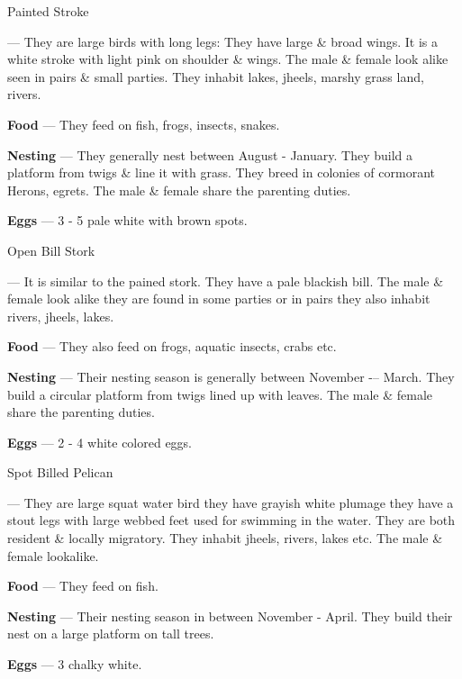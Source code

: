 \begin{bird}{Painted Stroke}

 --- They are large birds with long legs: They have large \& broad wings. It is a white stroke with light pink on shoulder \& wings. The male \& female look alike seen in pairs \& small parties. They inhabit lakes, jheels, marshy grass land, rivers.

{\large\bf Food} --- They feed on fish, frogs, insects, snakes.

{\large\bf Nesting} --- They generally nest between August - January. They build a platform from twigs \& line it with grass. They breed in colonies of cormorant Herons, egrets. The male \& female share the parenting duties.

{\large\bf Eggs} --- 3 - 5 pale white with brown spots.
\end{bird}

\begin{bird}{Open Bill Stork}

 --- It is similar to the pained stork. They have a pale blackish bill. The male \& female look alike they are found in some parties or in pairs they also inhabit rivers, jheels, lakes.

{\large\bf Food} --- They also feed on frogs, aquatic insects, crabs etc.

{\large\bf Nesting} --- Their nesting season is generally between November -– March. They build a circular platform from twigs lined up with leaves. The male \& female share the parenting duties. 

{\large\bf Eggs} --- 2 - 4 white colored eggs.
\end{bird}

\begin{bird}{Spot Billed Pelican}

 --- They are large squat water bird they have grayish white plumage they have a stout legs with large webbed feet used for swimming in the water. They are both resident \& locally migratory. They inhabit jheels, rivers, lakes etc. The male \& female lookalike. 

{\large\bf Food} --- They feed on fish.

{\large\bf Nesting} --- Their nesting season in between November - April. They build their nest on a large platform on tall trees.

{\large\bf Eggs} --- 3 chalky white.
\end{bird}

